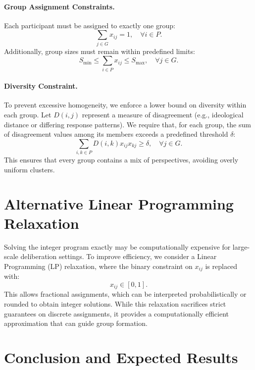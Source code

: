 \documentclass[11pt,a4paper]{article}
\begin{document}
\paragraph{Group Assignment Constraints.} Each participant must be assigned to exactly one group:
\begin{equation}
    \sum_{j \in G} x_{ij} = 1, \quad \forall i \in P.
\end{equation}
Additionally, group sizes must remain within predefined limits:
\begin{equation}
    S_{\min} \leq \sum_{i \in P} x_{ij} \leq S_{\max}, \quad \forall j \in G.
\end{equation}

\paragraph{Diversity Constraint.} To prevent excessive homogeneity, we enforce a lower bound on diversity within each group. Let \( D(i, j) \) represent a measure of disagreement (e.g., ideological distance or differing response patterns). We require that, for each group, the sum of disagreement values among its members exceeds a predefined threshold \( \delta \):
\begin{equation}
    \sum_{i,k \in P} D(i,k) x_{ij} x_{kj} \geq \delta, \quad \forall j \in G.
\end{equation}
This ensures that every group contains a mix of perspectives, avoiding overly uniform clusters.

\section{Alternative Linear Programming Relaxation}

Solving the integer program exactly may be computationally expensive for large-scale deliberation settings. To improve efficiency, we consider a Linear Programming (LP) relaxation, where the binary constraint on \( x_{ij} \) is replaced with:
\begin{equation}
    x_{ij} \in [0,1].
\end{equation}
This allows fractional assignments, which can be interpreted probabilistically or rounded to obtain integer solutions. While this relaxation sacrifices strict guarantees on discrete assignments, it provides a computationally efficient approximation that can guide group formation.

\section{Conclusion and Expected Results}
\end{document}
